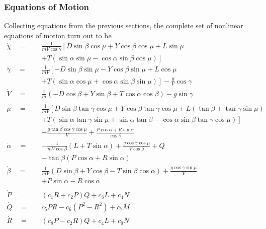 \documentclass[12pt]{ucthesis}
\begin{document}
\subsubsection{Equations of Motion}
\label{subsubsec: eom}
Collecting equations from the previous sections, the complete set of nonlinear equations of motion turn out to be
\begin{subequations} \label{eq: eom}
	\begin{align}
	\label{eq: eom_chidot}  	\dot{\chi} \quad=\quad	& \frac{1}{mV\cos\gamma}\left[ D\sin\beta\cos\mu + Y\cos\beta\cos\mu + L\sin\mu \right.\\
	 												& +\left. T\left(\sin\alpha\sin\mu - \cos\alpha\sin\beta\cos\mu \right) \right] \nonumber \\
	\label{eq: eom_gamdot}  	\dot{\gamma} \quad=\quad& \frac{1}{mV}\left[-D\sin\beta\sin\mu - Y\cos\beta\sin\mu + L\cos\mu \right.\\
													& +\left. T\left(\sin\alpha\cos\mu + \cos\alpha\sin\beta\sin\mu\right)\right] - \frac{g}{V}\cos\gamma \nonumber \\
	\label{eq: eom_vdot}  	\dot{V} \quad=\quad		& \frac{1}{m}\left(- D\cos\beta + Y\sin\beta + T\cos\alpha\cos\beta \right) - g\sin\gamma \\
	\nonumber \\
	\label{eq: eom_mudot}  	\dot{\mu} \quad=\quad	& \frac{1}{mV}\left[D\sin\beta\tan\gamma\cos\mu + Y\cos\beta\tan\gamma\cos\mu + L\left(\tan\beta + \tan\gamma\sin\mu\right) \right. \nonumber \\
													& +\left. T\left(\sin\alpha\tan\gamma\sin\mu + \sin\alpha\tan\beta - \cos\alpha\sin\beta\tan\gamma\cos\mu\right)\right] \\
													& -\frac{g\tan\beta\cos\gamma\cos\mu}{V} + \frac{P\cos\alpha + R\sin\alpha}{\cos\beta} \nonumber \\
	\label{eq: eom_alphdot} 	\dot{\alpha} \quad=\quad& -\frac{1}{mV\cos\beta}\left(L + T\sin\alpha \right) + \frac{g\cos\gamma\cos\mu}{V\cos\beta} + Q \\
													& - \tan\beta\left(P\cos\alpha + R\sin\alpha\right) \nonumber \\
	\label{eq: eom_betadot} 	\dot{\beta} \quad=\quad	& \frac{1}{mV}\left(D\sin\beta + Y\cos\beta - T\sin\beta\cos\alpha \right) + \frac{g\cos\gamma\sin\mu}{V} \\
													& + P\sin\alpha - R\cos\alpha  \nonumber \\
	\nonumber \\
	\label{eq: eom_pdot} 	\dot{P} \quad=\quad		& \left(c_1 R + c_2 P \right)Q + c_3 \bar{L} + c_4 \bar{N} \\
	\label{eq: eom_qdot} 	\dot{Q} \quad=\quad		& c_5 PR - c_6 \left( P^2 - R^2\right) + c_7 \bar{M} \\
	\label{eq: eom_rdot} 	\dot{R} \quad=\quad		& \left( c_8 P - c_2 R \right) Q + c_4 \bar{L} + c_9 \bar{N}
	\end{align}
\end{subequations}
\end{document}
